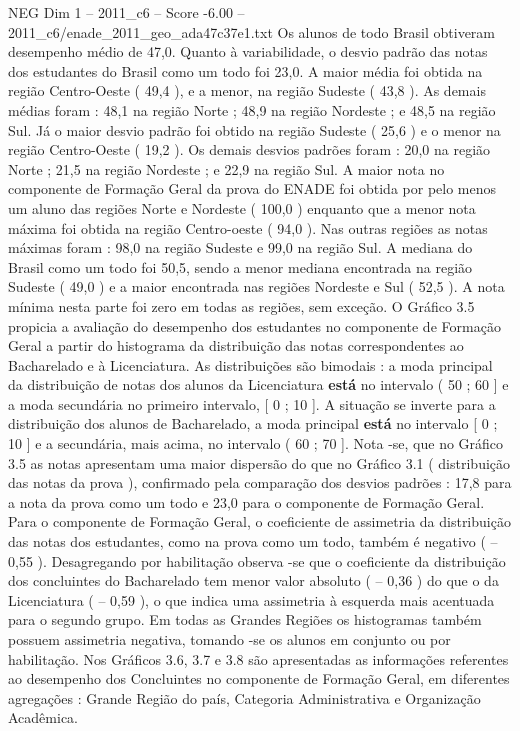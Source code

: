 \begin{textsample}{NEG Dim 1 – 2011\_c6 – Score -6.00 – 2011\_c6/enade\_2011\_geo\_ada47c37e1.txt}
Os alunos de todo Brasil obtiveram desempenho médio de 47,0.
Quanto à variabilidade, o desvio padrão das notas dos estudantes do Brasil como um todo foi 23,0.
A maior média foi obtida na região Centro-Oeste ( 49,4 ), e a menor, na região Sudeste ( 43,8 ).
As demais médias foram : 48,1 na região Norte ; 48,9 na região Nordeste ; e 48,5 na região Sul.
Já o maior desvio padrão foi obtido na região Sudeste ( 25,6 ) e o menor na região Centro-Oeste ( 19,2 ).
Os demais desvios padrões foram : 20,0 na região Norte ; 21,5 na região Nordeste ; e 22,9 na região Sul.
A maior nota no componente de Formação Geral da prova do ENADE foi obtida por pelo menos um aluno das regiões Norte e Nordeste ( 100,0 ) enquanto que a menor nota máxima foi obtida na região Centro-oeste ( 94,0 ).
Nas outras regiões as notas máximas foram : 98,0 na região Sudeste e 99,0 na região Sul.
A mediana do Brasil como um todo foi 50,5, sendo a menor mediana encontrada na região Sudeste ( 49,0 ) e a maior encontrada nas regiões Nordeste e Sul ( 52,5 ).
A nota mínima nesta parte foi zero em todas as regiões, sem exceção.
O Gráfico 3.5 propicia a avaliação do desempenho dos estudantes no componente de Formação Geral a partir do histograma da distribuição das notas correspondentes ao Bacharelado e à Licenciatura.
As distribuições são bimodais : a moda principal da distribuição de notas dos alunos da Licenciatura \textbf{está} no intervalo ( 50 ; 60 ] e a moda secundária no primeiro intervalo, [ 0 ; 10 ].
A situação se inverte para a distribuição dos alunos de Bacharelado, a moda principal \textbf{está} no intervalo [ 0 ; 10 ] e a secundária, mais acima, no intervalo ( 60 ; 70 ].
Nota -se, que no Gráfico 3.5 as notas apresentam uma maior dispersão do que no Gráfico 3.1 ( distribuição das notas da prova ), confirmado pela comparação dos desvios padrões : 17,8 para a nota da prova como um todo e 23,0 para o componente de Formação Geral.
Para o componente de Formação Geral, o coeficiente de assimetria da distribuição das notas dos estudantes, como na prova como um todo, também é negativo ( – 0,55 ).
Desagregando por habilitação observa -se que o coeficiente da distribuição dos concluintes do Bacharelado tem menor valor absoluto ( – 0,36 ) do que o da Licenciatura ( – 0,59 ), o que indica uma assimetria à esquerda mais acentuada para o segundo grupo.
Em todas as Grandes Regiões os histogramas também possuem assimetria negativa, tomando -se os alunos em conjunto ou por habilitação.
Nos Gráficos 3.6, 3.7 e 3.8 são apresentadas as informações referentes ao desempenho dos Concluintes no componente de Formação Geral, em diferentes agregações : Grande Região do país, Categoria Administrativa e Organização Acadêmica.

\end{textsample}
